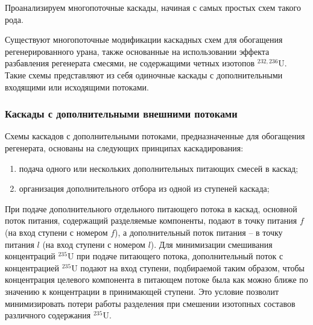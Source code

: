 Проанализируем многопоточные каскады, начиная с самых простых схем такого рода.

Существуют многопоточные модификации каскадных схем для обогащения регенерированного урана, также основанные на использовании эффекта разбавления регенерата смесями, не содержащими четных изотопов $^{232,236}$U. Такие схемы представляют из себя одиночные каскады с дополнительными входящими или исходящими потоками.

\subsubsection{Каскады с дополнительными внешними потоками}

Схемы каскадов с дополнительными потоками, предназначенные для обогащения регенерата, основаны на следующих принципах каскадирования:
\begin{enumerate}
  \item подача одного или нескольких дополнительных питающих смесей в каскад;
  \item организация дополнительного отбора из одной из ступеней каскада;
\end{enumerate}

При подаче дополнительного отдельного питающего потока в каскад, основной поток питания, содержащий разделяемые компоненты, подают в точку питания $f$(на вход ступени с номером $f$), а дополнительный поток питания -- в точку питания $l$ (на вход ступени с номером $l$). Для минимизации смешивания концентраций $^{235}$U при подаче питающего потока, дополнительный поток с концентрацией $^{235}$U подают на вход ступени, подбираемой таким образом, чтобы концентрация целевого компонента в питающем потоке была как можно ближе по значению к концентрации в принимающей ступени. Это условие позволит минимизировать потери работы разделения при смешении изотопных составов различного содержания $^{235}$U.

